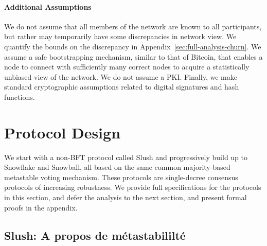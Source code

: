 \documentclass[letterpaper,twocolumn,10pt]{article}
\newcommand{\editinsert}[1]{{\color{blue}#1}}
\theoremstyle{definition}
\begin{document}
\paragraph{Additional Assumptions}
We do not assume that all members of the network are known to all participants, but rather may temporarily have some discrepancies in network view.
We quantify the bounds on the discrepancy in Appendix~\ref{sec:full-analysis-churn}.
We assume a safe bootstrapping mechanism, similar to that of Bitcoin, that enables a node to connect with sufficiently many correct nodes to acquire a statistically unbiased view of the network.
We do not assume a PKI\@.
Finally, we make standard cryptographic assumptions related to digital signatures and hash functions.


\section{Protocol Design}\label{sec:protocol}
We start with a non-BFT protocol called Slush and progressively build up to Snowflake and Snowball, all based on the same common majority-based metastable voting mechanism.
These protocols are single-decree consensus protocols of increasing robustness.
We provide full specifications for the protocols in this section, and defer the analysis to the next section, and present formal proofs in the appendix.

\subsection{Slush: A propos de métastabililté}

\end{document}
